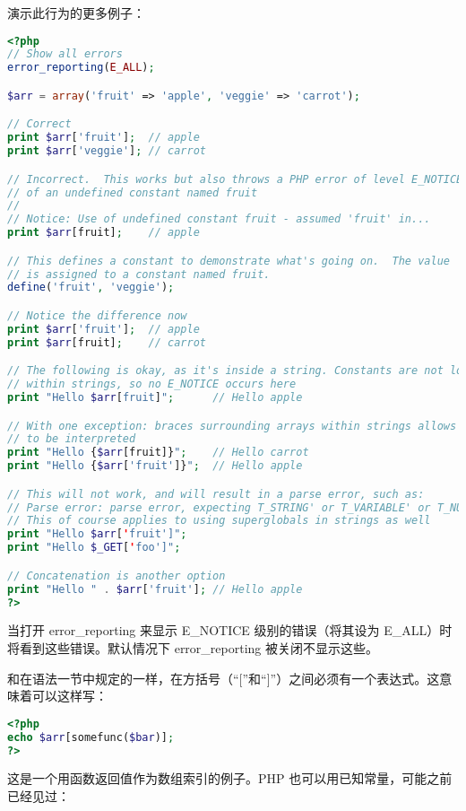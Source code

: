 演示此行为的更多例子：


\begin{lstlisting}[language=PHP]
<?php
// Show all errors
error_reporting(E_ALL);

$arr = array('fruit' => 'apple', 'veggie' => 'carrot');

// Correct
print $arr['fruit'];  // apple
print $arr['veggie']; // carrot

// Incorrect.  This works but also throws a PHP error of level E_NOTICE because
// of an undefined constant named fruit
// 
// Notice: Use of undefined constant fruit - assumed 'fruit' in...
print $arr[fruit];    // apple

// This defines a constant to demonstrate what's going on.  The value 'veggie'
// is assigned to a constant named fruit.
define('fruit', 'veggie');

// Notice the difference now
print $arr['fruit'];  // apple
print $arr[fruit];    // carrot

// The following is okay, as it's inside a string. Constants are not looked for
// within strings, so no E_NOTICE occurs here
print "Hello $arr[fruit]";      // Hello apple

// With one exception: braces surrounding arrays within strings allows constants
// to be interpreted
print "Hello {$arr[fruit]}";    // Hello carrot
print "Hello {$arr['fruit']}";  // Hello apple

// This will not work, and will result in a parse error, such as:
// Parse error: parse error, expecting T_STRING' or T_VARIABLE' or T_NUM_STRING'
// This of course applies to using superglobals in strings as well
print "Hello $arr['fruit']";
print "Hello $_GET['foo']";

// Concatenation is another option
print "Hello " . $arr['fruit']; // Hello apple
?>
\end{lstlisting}

当打开 error\_reporting 来显示 E\_NOTICE 级别的错误（将其设为 E\_ALL）时将看到这些错误。默认情况下 error\_reporting 被关闭不显示这些。

和在语法一节中规定的一样，在方括号（“[”和“]”）之间必须有一个表达式。这意味着可以这样写：


\begin{lstlisting}[language=PHP]
<?php
echo $arr[somefunc($bar)];
?>
\end{lstlisting}


这是一个用函数返回值作为数组索引的例子。PHP 也可以用已知常量，可能之前已经见过：





